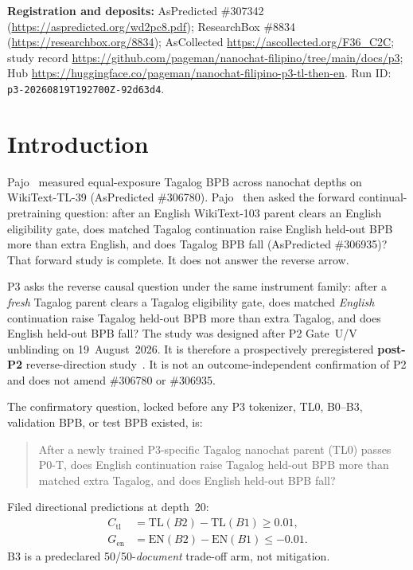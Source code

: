\documentclass[11pt,a4paper]{article}
\begin{document}
\noindent\textbf{Registration and deposits:} AsPredicted \#307342 (\url{https://aspredicted.org/wd2pc8.pdf}); ResearchBox \#8834 (\url{https://researchbox.org/8834}); AsCollected \url{https://ascollected.org/F36_C2C}; study record \url{https://github.com/pageman/nanochat-filipino/tree/main/docs/p3}; Hub \url{https://huggingface.co/pageman/nanochat-filipino-p3-tl-then-en}. Run ID: \texttt{p3-20260819T192700Z-92d63d4}.

\section{Introduction}
\label{sec:intro}

Pajo~\cite{pajo2026p11} measured equal-exposure Tagalog BPB across nanochat depths on WikiText-TL-39 (AsPredicted \#306780). Pajo~\cite{pajo2026p2} then asked the forward continual-pretraining question: after an English WikiText-103 parent clears an English eligibility gate, does matched Tagalog continuation raise English held-out BPB more than extra English, and does Tagalog BPB fall (AsPredicted \#306935)? That forward study is complete. It does not answer the reverse arrow.

P3 asks the reverse causal question under the same instrument family: after a \emph{fresh} Tagalog parent clears a Tagalog eligibility gate, does matched \emph{English} continuation raise Tagalog held-out BPB more than extra Tagalog, and does English held-out BPB fall? The study was designed after P2 Gate~U/V unblinding on 19~August~2026. It is therefore a prospectively preregistered \textbf{post-P2} reverse-direction study~\cite{aspredicted307342}. It is not an outcome-independent confirmation of P2 and does not amend \#306780 or \#306935.

The confirmatory question, locked before any P3 tokenizer, TL0, B0--B3, validation BPB, or test BPB existed, is:

\begin{quote}
After a newly trained P3-specific Tagalog nanochat parent (TL0) passes P0-T, does English continuation raise Tagalog held-out BPB more than matched extra Tagalog, and does English held-out BPB fall?
\end{quote}

Filed directional predictions at depth~20:
\begin{align}
C_{\mathrm{tl}}&=\mathrm{TL}(B2)-\mathrm{TL}(B1)\ge 0.01,\\
G_{\mathrm{en}}&=\mathrm{EN}(B2)-\mathrm{EN}(B1)\le -0.01.
\end{align}
B3 is a predeclared 50/50-\emph{document} trade-off arm, not mitigation.
\end{document}
